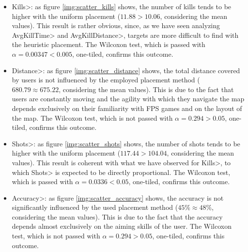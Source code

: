\begin{itemize}
\item \<Kills>: as figure \ref{img:scatter_kills} shows, the number of kills tends to be higher with the uniform placement ($11.88 > 10.06$, considering the mean values). This result is rather obvious, since, as we have seen analyzing \<AvgKillTime> and \<AvgKillDistance>, targets are more difficult to find with the heuristic placement. The Wilcoxon test, which is passed with $\alpha = 0.00347 < 0.005$, one-tiled, confirms this outcome. 
\item \<Distance>: as figure \ref{img:scatter_distance} shows, the total distance covered by users is not influenced by the employed placement method ($680.79\approx675.22$, considering the mean values). This is due to the fact that users are constantly moving and the agility with which they navigate the map depends exclusively on their familiarity with FPS games and on the layout of the map. The Wilcoxon test, which is not passed with $\alpha = 0.294 > 0.05$, one-tiled, confirms this outcome.
\item \<Shots>: as figure \ref{img:scatter_shots} shows, the number of shots tends to be higher with the uniform placement ($117.44 >  104.04$, considering the mean values). This result is coherent with what we have observed for \<Kills>, to which \<Shots> is expected to be directly proportional. The Wilcoxon test, which is passed with $\alpha = 0.0336 < 0.05$, one-tiled, confirms this outcome.
\item \<Accuracy>: as figure \ref{img:scatter_accuracy} shows, the accuracy is not significantly influenced by the used placement method ($45\% \approx 48\%$, considering the mean values). This is due to the fact that the accuracy depends almost exclusively on the aiming skills of the user. The Wilcoxon test, which is not passed with $\alpha = 0.294 > 0.05$, one-tiled, confirms this outcome.
\end{itemize}

